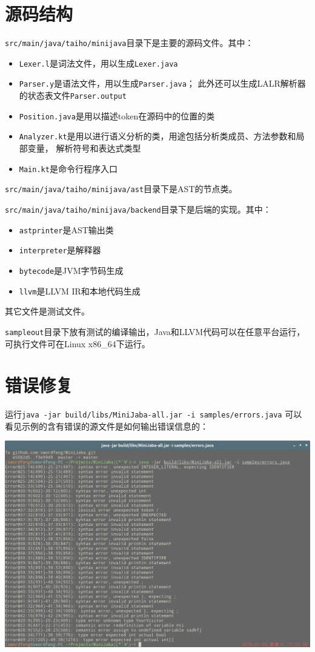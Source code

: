 \documentclass[a4paper]{article}
\begin{document}
\section{源码结构}
{\tt src/main/java/taiho/minijava}目录下是主要的源码文件。其中：
\begin{itemize}
    \item {\tt Lexer.l}是词法文件，用以生成{\tt Lexer.java}
    \item {\tt Parser.y}是语法文件，用以生成{\tt Parser.java}；
          此外还可以生成LALR解析器的状态表文件{\tt Parser.output}
    \item {\tt Position.java}是用以描述token在源码中的位置的类
    \item {\tt Analyzer.kt}是用以进行语义分析的类，用途包括分析类成员、方法参数和局部变量，
        解析符号和表达式类型
    \item {\tt Main.kt}是命令行程序入口
\end{itemize} \par
{\tt src/main/java/taiho/minijava/ast}目录下是AST的节点类。 \par
{\tt src/main/java/taiho/minijava/backend}目录下是后端的实现。其中：
\begin{itemize}
    \item {\tt astprinter}是AST输出类
    \item {\tt interpreter}是解释器
    \item {\tt bytecode}是JVM字节码生成
    \item {\tt llvm}是LLVM IR和本地代码生成
\end{itemize} \par
其它文件是测试文件。\par
{\tt sampleout}目录下放有测试的编译输出，Java和LLVM代码可以在任意平台运行，
可执行文件可在Linux x86\_64下运行。

\section{错误修复}
运行{\tt java -jar build/libs/MiniJaba-all.jar -i samples/errors.java}
可以看见示例的含有错误的源文件是如何输出错误信息的：

\includegraphics[width=\textwidth]{screenshot}
\end{document}
